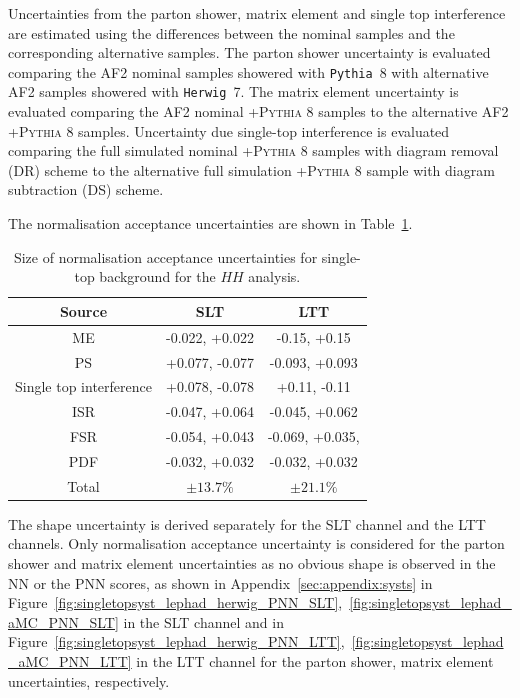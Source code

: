 Uncertainties from the parton shower, matrix element
and single top interference are estimated using 
the differences between the nominal samples and the corresponding 
alternative samples.
The parton shower uncertainty is evaluated comparing 
the AF2 nominal samples showered with \texttt{Pythia}~8 with alternative 
AF2 samples showered with \texttt{Herwig}~7.  
The matrix element uncertainty is evaluated comparing the AF2 nominal \POWHEG+\textsc{Pythia 8}
samples to the alternative AF2 \AMCatNLO+\textsc{Pythia 8} samples.  
Uncertainty due single-top interference is evaluated comparing the full simulated nominal 
\POWHEG+\textsc{Pythia 8} samples with diagram removal (DR) scheme to the alternative 
full simulation \POWHEG+\textsc{Pythia 8} sample with diagram subtraction (DS) scheme.

The normalisation acceptance uncertainties are shown in 
Table~\ref{sec:systs:tab:systematics_normalisations_singletop}.

\begin{table}
\centering
\small
\begin{tabular}{|c|c|c|}
\hline
Source & SLT & LTT \\
\hline
ME & -0.022, +0.022 & -0.15, +0.15  \\  
PS & +0.077, -0.077 & -0.093, +0.093  \\
Single top interference & +0.078, -0.078 & +0.11, -0.11  \\
ISR & -0.047, +0.064 & -0.045, +0.062  \\ 
FSR & -0.054, +0.043 & -0.069, +0.035,  \\
PDF & -0.032, +0.032 & -0.032, +0.032   \\
Total & $\pm 13.7\%$ & $\pm 21.1\%$ \\
\hline
\end{tabular}
\caption{Size of normalisation acceptance uncertainties for single-top background for the $HH$ analysis.}
\label{sec:systs:tab:systematics_normalisations_singletop}
\end{table}

  
The shape uncertainty is derived separately for the SLT channel and the LTT channels. 
Only normalisation acceptance uncertainty is considered for the parton shower and matrix element uncertainties 
as no obvious shape is observed in the NN or the PNN scores,
as shown in Appendix~\ref{sec:appendix:systs} 
in Figure~\ref{fig:singletopsyst_lephad_herwig_PNN_SLT},~\ref{fig:singletopsyst_lephad_aMC_PNN_SLT}
in the SLT channel and 
in Figure~\ref{fig:singletopsyst_lephad_herwig_PNN_LTT},~\ref{fig:singletopsyst_lephad_aMC_PNN_LTT}
in the LTT channel
for the parton shower, matrix element uncertainties, respectively.

